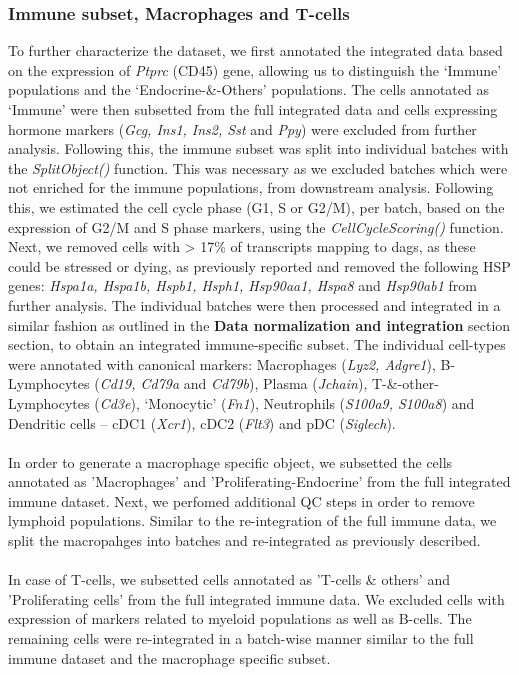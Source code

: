 \subsubsection{\large Immune subset, Macrophages and T-cells}
To further characterize the dataset, we first annotated the integrated data based on the expression of \textit{Ptprc} (CD45) gene, allowing us to distinguish the ‘Immune’ populations and the `Endocrine-\&-Others' populations. The cells annotated as `Immune' were then subsetted from the full integrated data and cells expressing hormone markers (\textit{Gcg, Ins1, Ins2, Sst} and \textit{Ppy}) were excluded from further analysis. Following this, the immune subset was split into individual batches with the \textit{SplitObject()} function. This was necessary as we excluded batches which were not enriched for the immune populations, from downstream analysis. Following this, we estimated the cell cycle phase (G1, S or G2/M), per batch, based on the expression of G2/M and S phase markers, using the \textit{CellCycleScoring()} function. Next, we removed cells with > 17\% of transcripts mapping to \glspl{dag}, as these could be stressed or dying, as previously reported \textbf{\cite{}} and removed the following HSP genes: \textit{Hspa1a, Hspa1b, Hspb1, Hsph1, Hsp90aa1, Hspa8} and \textit{Hsp90ab1}  from further analysis. The individual batches were then processed and integrated in a similar fashion as outlined in the \textbf{Data normalization and integration} section section, to obtain an integrated immune-specific subset. The individual cell-types were annotated with canonical markers: Macrophages (\textit{Lyz2, Adgre1}), B-Lymphocytes (\textit{Cd19, Cd79a} and \textit{Cd79b}), Plasma (\textit{Jchain}), T-\&-other-Lymphocytes (\textit{Cd3e}), `Monocytic’ (\textit{Fn1}), Neutrophils (\textit{S100a9, S100a8}) and Dendritic cells – cDC1 (\textit{Xcr1}), cDC2 (\textit{Flt3}) and pDC (\textit{Siglech}).\\\\
In order to generate a macrophage specific object, we subsetted the cells annotated as 'Macrophages' and 'Proliferating-Endocrine' from the full integrated immune dataset. Next, we perfomed additional QC steps in order to remove lymphoid populations. Similar to the re-integration of the full immune data, we split the macropahges into batches and re-integrated as previously described.\\\\ 
In case of T-cells, we subsetted cells annotated as 'T-cells \& others' and 'Proliferating cells' from the full integrated immune data. We excluded cells with expression of markers related to myeloid populations as well as B-cells. The remaining cells were re-integrated in a batch-wise manner similar to the full immune dataset and the macrophage specific subset.

